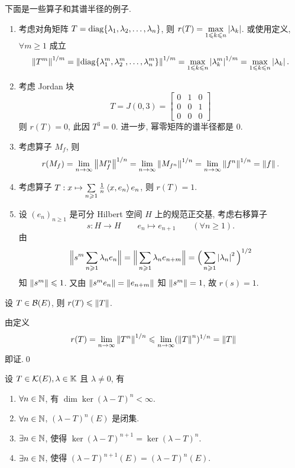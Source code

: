 	\begin{Example}
		下面是一些算子和其谱半径的例子.
		\begin{enumerate}[(1)]
			\item 考虑对角矩阵 $ T=\operatorname{diag}\{ \lambda_{1}, \lambda_{2}, \dots, \lambda_{n} \} $, 则 $ r(T)=\max\limits_{1\leqslant k\leqslant n}\left| \lambda_{k} \right|  $. 或使用定义, $ \forall m\geqslant1 $ 成立
			\[
				\left\| T^{m} \right\|^{1/m}=\left\| \operatorname{diag}\{ \lambda^{m}_{1}, \lambda^{m}_{2}, \dots, \lambda^{m}_{n} \} \right\|^{1/m}=\max_{1\leqslant k\leqslant n}\left| \lambda_{k}^{m} \right| ^{1/m}=\max_{1\leqslant k\leqslant n}\left| \lambda_{k} \right| .
			\]
			\item 考虑 Jordan 块
			\[
				T = J(0, 3)=\begin{bmatrix}
					0 & 1 & 0\\
					0 & 0 & 1\\
					0 & 0 & 0
				\end{bmatrix}
			\]
			则 $ r(T)=0 $, 此因 $ T^{3}=0 $. 进一步, 幂零矩阵的谱半径都是 0.
			\item 考虑算子 $ M_{f} $, 则
			\[
				r(M_{f}) = \lim_{n\to\infty}\left\| M_{f}^{n} \right\|^{1/n}=\lim_{n\to\infty}\left\| M_{f^{n}} \right\|^{1/n}=\lim_{n\to\infty}\left\| f^{n} \right\|^{1/n}=\left\| f \right\|.
			\]
			\item 考虑算子 $ T: x\mapsto\sum\limits_{n\geqslant1}\frac{1}{n}\left\langle x, e_{n} \right\rangle e_{n} $, 则 $ r(T)=1 $.
			\item 设 $ (e_{n})_{n\geqslant1} $ 是可分 Hilbert 空间 $ H $ 上的规范正交基, 考虑右移算子
			\[
				s: H\to H\qquad e_{n}\mapsto e_{n+1}\qquad (\forall n\geqslant1).
			\]
			由
			\[
				\Big\| s^{m}\sum_{n\geqslant1}\lambda_{n}e_{n} \Big\|=\Big\| \sum_{n\geqslant1}\lambda_{n}e_{n+m} \Big\|=\Big( \sum_{n\geqslant1}\left| \lambda_{n} \right| ^{2} \Big)^{1/2}
			\]
			知 $ \left\| s^{m} \right\|\leqslant1 $. 又由 $ \left\| s^{m}e_{n} \right\|=\left\| e_{n+m} \right\| $ 知 $ \left\| s^{m} \right\|=1 $, 故 $ r(s)=1 $. 
		\end{enumerate}
	\end{Example}

	\begin{Corollary}
		设 $ T\in\mathcal{B}(E) $, 则 $ r(T)\leqslant\left\| T \right\| $.
	\end{Corollary}
	\begin{Proof}
		由定义
		\[
			r(T)=\lim_{n\to\infty}\left\| T^{n} \right\|^{1/n}\leqslant\lim_{n\to\infty}(\left\| T \right\|^{n})^{1/n}=\left\| T \right\|
		\]
		即证.\qed
	\end{Proof}
	
	\begin{Theorem}\label{thm:lambda-T的性质}
		设 $ T\in\mathcal{K}(E), \lambda\in\mathbb{K} $ 且 $ \lambda\ne0 $, 有
		\begin{enumerate}[(1)]
			\item $ \forall n\in\mathbb{N} $, 有 $ \dim\ker(\lambda-T)^{n}<\infty $.
			\item $ \forall n\in\mathbb{N} $, $ (\lambda-T)^{n}(E) $ 是闭集.
			\item $ \exists n\in\mathbb{N} $, 使得 $ \ker(\lambda-T)^{n+1}=\ker(\lambda-T)^{n} $.
			\item $ \exists n\in\mathbb{N} $, 使得 $ (\lambda-T)^{n+1}(E)=(\lambda-T)^{n}(E) $.
		\end{enumerate}
	\end{Theorem}

